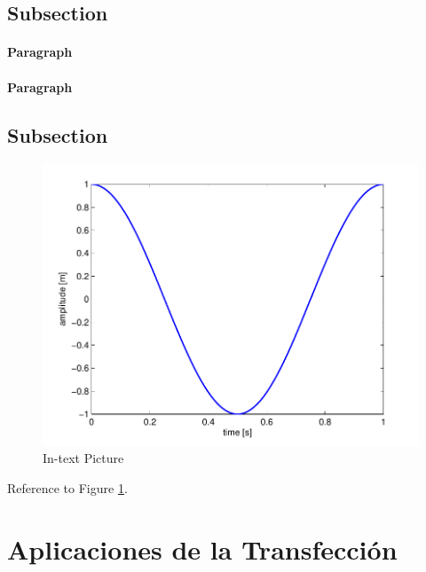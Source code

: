 \documentclass[fleqn,10pt]{SelfArx} %
\begin{document}
\subsection{Subsection}



\paragraph{Paragraph} %
\paragraph{Paragraph} %

\subsection{Subsection}

\begin{figure}[ht]\centering
\includegraphics[width=\linewidth]{images/results}
\caption{In-text Picture}
\label{fig:results}
\end{figure}

Reference to Figure \ref{fig:results}.


\section{Aplicaciones de la Transfección}
\end{document}
